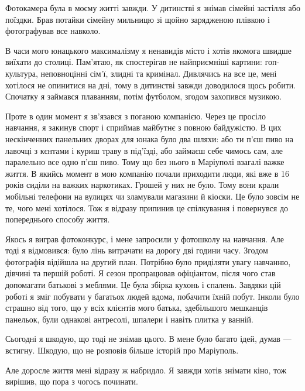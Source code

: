 Фотокамера була в моєму житті завжди. У дитинстві я знімав сімейні застілля або
поїздки. Брав потайки сімейну мильницю зі щойно зарядженою плівкою і
фотографував все навколо.

В часи мого юнацького максималізму я ненавидів місто і хотів якомога швидше
виїхати до столиці. Пам'ятаю, як спостерігав не найприємніші картини:
гоп-культура, неповноцінні сім'ї, злидні та кримінал. Дивлячись на все це, мені
хотілося не опинитися на дні, тому в дитинстві завжди доводилося щось робити.
Спочатку я займався плаванням, потім футболом, згодом захопився музикою. 


Проте в один момент я зв'язався з поганою компанією. Через це просіло навчання,
я закинув спорт і сприймав майбутнє з повною байдужістю. В цих нескінченних
панельних дворах для юнака було два шляхи: або ти п'єш пиво на лавочці з
кєнтами і куриш траву в під'їзді, або займаєш себе чимось сам, але паралельно
все одно п'єш пиво. Тому що без нього в Маріуполі взагалі важке життя. В якийсь
момент в мою компанію почали приходити люди, які вже в 16 років сиділи на
важких наркотиках. Грошей у них не було. Тому вони крали мобільні телефони на
вулицях чи зламували магазини й кіоски. Це було зовсім не те, чого мені
хотілося. Тож я відразу припинив це спілкування і повернувся до попереднього
способу життя.


Якось я виграв фотоконкурс, і мене запросили у фотошколу на навчання. Але тоді
я відмовився: було лінь витрачати на дорогу дві години часу. Згодом фотографія
відійшла на другий план. Потрібно було приділяти увагу навчанню, дівчині та
першій роботі. Я сезон пропрацював офіціантом, після чого став допомагати
батькові з меблями. Це була збірка кухонь і спалень. Завдяки цій роботі я зміг
побувати у багатьох людей вдома, побачити їхній побут. Інколи було страшно від
того, що у всіх клієнтів мого батька, здебільшого мешканців панельок, були
однакові антресолі, шпалери і навіть плитка у ванній.

Сьогодні я шкодую, що тоді не знімав цього. В мене було багато ідей, думав —
встигну. Шкодую, що не розповів більше історій про Маріуполь. 


Але доросле життя мені відразу ж набридло. Я завжди хотів знімати кіно, тож
вирішив, що пора з чогось починати.

